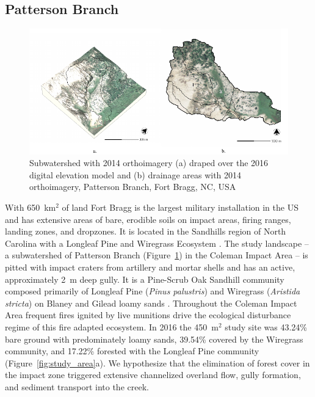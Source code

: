 \documentclass[gmd, manuscript]{copernicus}
\begin{document}
\subsection{Patterson Branch}

\begin{figure}
\center
\includegraphics[width=\textwidth,height=0.95\textheight,keepaspectratio]{figures/watershed.pdf}
\caption{Subwatershed with 2014 orthoimagery
(a) draped over the 2016 digital elevation model
and (b) drainage areas with 2014 orthoimagery, Patterson Branch, Fort Bragg, NC, USA}
\label{fig:watershed}
\end{figure}

With 650~\unit{km}$^{2}$ of land
Fort Bragg is the largest military installation in the US
and has extensive areas of bare, erodible soils
on impact areas, firing ranges, landing zones, and dropzones. 
It is located in the Sandhills region of North Carolina 
with a Longleaf Pine and Wiregrass Ecosystem \citep{Sorrie2006}.
%
The study landscape 
-- a subwatershed of Patterson Branch (Figure~\ref{fig:watershed}) 
in the Coleman Impact Area --
is pitted with impact craters from artillery and mortar shells
and has an active, approximately 2~\unit{m} deep gully. 
%
It is a Pine-Scrub Oak Sandhill community
composed primarily of Longleaf Pine (\emph{Pinus palustris})
and Wiregrass (\emph{Aristida stricta})
on Blaney and Gilead loamy sands 
\citep{Sorrie2004}. 
%
Throughout the Coleman Impact Area
frequent fires ignited by live munitions
drive the ecological disturbance regime
of this fire adapted ecosystem.
%
In 2016 the  450~\unit{m}$^{2}$ study site was
43.24\% bare ground with predominately loamy sands,
39.54\% covered by the Wiregrass community, and
17.22\% forested with the Longleaf Pine community 
(Figure~\ref{fig:study_area}a). 
%
We hypothesize that the elimination of forest cover
in the impact zone
triggered extensive channelized overland flow,
gully formation, and sediment transport into the creek. 
\end{document}
